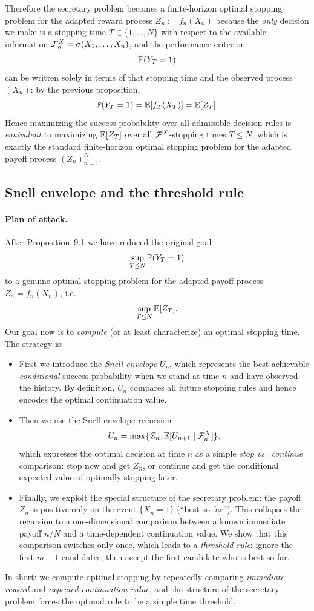 Therefore the secretary problem becomes a finite-horizon optimal stopping problem for the adapted reward
process $Z_n:=f_n(X_n)$ because the \emph{only} decision we make is a stopping time $T\in\{1,\dots,N\}$
with respect to the available information $\mathcal{F}_n^X=\sigma(X_1,\dots,X_n)$, and the performance criterion
\[
\mathbb{P}(Y_T=1)
\]
can be written solely in terms of that stopping time and the observed process $(X_n)$:
by the previous proposition,
\[
\mathbb{P}(Y_T=1)=\mathbb{E}\!\left[f_T(X_T)\right]=\mathbb{E}[Z_T].
\]
Hence maximizing the success probability over all admissible decision rules is \emph{equivalent} to
maximizing $\mathbb{E}[Z_T]$ over all $\mathcal{F}^X$-stopping times $T\le N$, which is exactly the standard finite-horizon
optimal stopping problem for the adapted payoff process $(Z_n)_{n=1}^N$.

\subsection*{Snell envelope and the threshold rule}

\paragraph{Plan of attack.}
After Proposition~9.1 we have reduced the original goal
\[
\sup_{T\le N}\mathbb{P}(Y_T=1)
\]
to a genuine optimal stopping problem for the adapted payoff process $Z_n=f_n(X_n)$, i.e.
\[
\sup_{T\le N}\mathbb{E}[Z_T].
\]
Our goal now is to \emph{compute}
(or at least characterize) an optimal stopping time. The strategy is:
\begin{itemize}
\item First we introduce the \emph{Snell envelope} $U_n$, which represents the best achievable
\emph{conditional} success probability when we stand at time $n$ and have observed the history.
By definition, $U_n$ compares all future stopping rules and hence encodes the optimal continuation value.
\item Then we use the Snell-envelope recursion
\[
U_n=\max\{Z_n,\mathbb{E}[U_{n+1}\mid \mathcal{F}_n^X]\},
\]
which expresses the optimal decision at time $n$ as a simple \emph{stop vs.\ continue} comparison:
stop now and get $Z_n$, or continue and get the conditional expected value of optimally stopping later.
\item Finally, we exploit the special structure of the secretary problem:
the payoff $Z_n$ is positive only on the event $\{X_n=1\}$ (``best so far'').
This collapses the recursion to a one-dimensional comparison between a known immediate payoff $n/N$
and a time-dependent continuation value.  We show that this comparison switches only once,
which leads to a \emph{threshold rule}: ignore the first $m-1$ candidates, then accept the first
candidate who is best so far.
\end{itemize}
In short: we compute optimal stopping by repeatedly comparing \emph{immediate reward} and
\emph{expected continuation value}, and the structure of the secretary problem forces the optimal rule
to be a simple time threshold.



